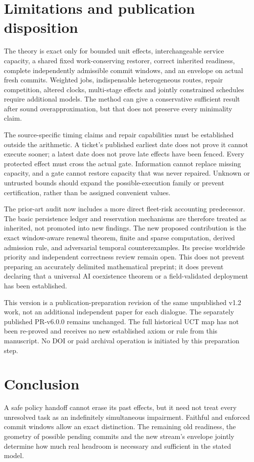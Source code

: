\documentclass[11pt,a4paper]{article}
\theoremstyle{definition}\newtheorem{definition}{Definition}
\begin{document}
\section{Limitations and publication disposition}
The theory is exact only for bounded unit effects, interchangeable service capacity, a shared fixed work-conserving restorer, correct inherited readiness, complete independently admissible commit windows, and an envelope on actual fresh commits. Weighted jobs, indispensable heterogeneous routes, repair competition, altered clocks, multi-stage effects and jointly constrained schedules require additional models. The method can give a conservative sufficient result after sound overapproximation, but that does not preserve every minimality claim.

The source-specific timing claims and repair capabilities must be established outside the arithmetic. A ticket's published earliest date does not prove it cannot execute sooner; a latest date does not prove late effects have been fenced. Every protected effect must cross the actual gate. Information cannot replace missing capacity, and a gate cannot restore capacity that was never repaired. Unknown or untrusted bounds should expand the possible-execution family or prevent certification, rather than be assigned convenient values.

The prior-art audit now includes a more direct fleet-risk accounting predecessor. The basic persistence ledger and reservation mechanisms are therefore treated as inherited, not promoted into new findings. The new proposed contribution is the exact window-aware renewal theorem, finite and sparse computation, derived admission rule, and adversarial temporal counterexamples. Its precise worldwide priority and independent correctness review remain open. This does not prevent preparing an accurately delimited mathematical preprint; it does prevent declaring that a universal AI coexistence theorem or a field-validated deployment has been established.

This version is a publication-preparation revision of the same unpublished v1.2 work, not an additional independent paper for each dialogue. The separately published PR-v6.0.0 \cite{pr6} remains unchanged. The full historical UCT map has not been re-proved and receives no new established axiom or rule from this manuscript. No DOI or paid archival operation is initiated by this preparation step.

\section{Conclusion}
A safe policy handoff cannot erase its past effects, but it need not treat every unresolved task as an indefinitely simultaneous impairment. Faithful and enforced commit windows allow an exact distinction. The remaining old readiness, the geometry of possible pending commits and the new stream's envelope jointly determine how much real headroom is necessary and sufficient in the stated model.
\end{document}
